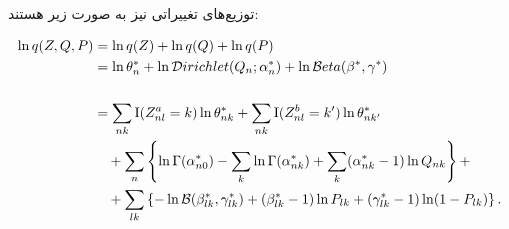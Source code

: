\newpage
توزیع‌های تغییراتی نیز به صورت زیر هستند:


\begin{align*}
\ln \AppProb{Z, Q, P} &= \ln \AppProb{Z}
	+ \ln \AppProb{Q}
	+ \ln \AppProb{P}
\\ %
	&= \ln \theta_n^*
		+ \ln \Dir{Q_n; \alpha_n^*}
		+ \ln \BetaDist{\beta^*}{\gamma^*}
\\ \\ %
	&= \sum_{nk} \Indic{Z_{nl}^a=k} \ln \theta_{nk}^*
		+ \sum_{nk} \Indic{Z_{nl}^b=k'} \ln \theta_{nk'}^*							\\
	& \quad + \sum_n \left\{
		\ln \GammaFunc{\alpha_{n0}^*}
		- \sum_k \ln \GammaFunc{\alpha_{nk}^*}
		+ \sum_k (\alpha_{nk}^* - 1) \ln Q_{nk}
	\right\} +																		\\
	& \quad + \sum_{lk} \left\{
		- \ln \BetaFunc{\beta_{lk}^*}{\gamma_{lk}^*}
		+ (\beta_{lk}^* - 1) \ln P_{lk}
		+ (\gamma_{lk}^* - 1) \ln (1 - P_{lk})
	\right\}.
\end{align*}
